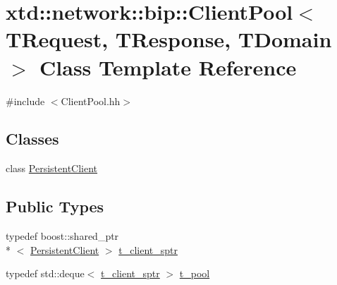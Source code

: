 \hypertarget{classxtd_1_1network_1_1bip_1_1ClientPool}{\section{xtd\-:\-:network\-:\-:bip\-:\-:Client\-Pool$<$ T\-Request, T\-Response, T\-Domain $>$ Class Template Reference}
\label{classxtd_1_1network_1_1bip_1_1ClientPool}
}


{\ttfamily \#include $<$Client\-Pool.\-hh$>$}

\subsection*{Classes}
\begin{DoxyCompactItemize}
\item 
class \hyperlink{classxtd_1_1network_1_1bip_1_1ClientPool_1_1PersistentClient}{Persistent\-Client}
\end{DoxyCompactItemize}
\subsection*{Public Types}
\begin{DoxyCompactItemize}
\item 
typedef boost\-::shared\-\_\-ptr\\*
$<$ \hyperlink{classxtd_1_1network_1_1bip_1_1ClientPool_1_1PersistentClient}{Persistent\-Client} $>$ \hyperlink{classxtd_1_1network_1_1bip_1_1ClientPool_ac3b215a76aeb124011801824f993a52b}{t\-\_\-client\-\_\-sptr}
\item 
typedef std\-::deque$<$ \hyperlink{classxtd_1_1network_1_1bip_1_1ClientPool_ac3b215a76aeb124011801824f993a52b}{t\-\_\-client\-\_\-sptr} $>$ \hyperlink{classxtd_1_1network_1_1bip_1_1ClientPool_ab0b045804570a41e6e491a715d56a469}{t\-\_\-pool}
\end{DoxyCompactItemize}
